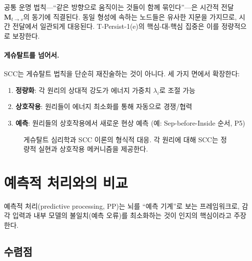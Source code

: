 공통 운명 법칙---``같은 방향으로 움직이는 것들이 함께 묶인다''---은 시간적 전달 $\mathbf{M}_{t \to s}$의 동기에 직결된다. 동일 형성에 속하는 노드들은 유사한 지문을 가지므로, 시간 전달에서 일관되게 대응된다. T-Persist-1(e)의 핵심-대-핵심 집중은 이를 정량적으로 보장한다.

\paragraph{게슈탈트를 넘어서.} SCC는 게슈탈트 법칙을 단순히 재진술하는 것이 아니다. 세 가지 면에서 확장한다:
\begin{enumerate}
    \item \textbf{정량화}: 각 원리의 상대적 강도가 에너지 가중치 $\lambda_i$로 조절 가능
    \item \textbf{상호작용}: 원리들이 에너지 최소화를 통해 자동으로 경쟁/협력
    \item \textbf{예측}: 원리들의 상호작용에서 새로운 현상 예측 (예: Sep-before-Inside 순서, P5)
\end{enumerate}

\begin{figure}[t]
\centering
{}
\caption{게슈탈트 심리학과 SCC 이론의 형식적 대응. 각 원리에 대해 SCC는 정량적 실현과 상호작용 메커니즘을 제공한다.}
\label{fig:gestalt-mapping}
\end{figure}


\section{예측적 처리와의 비교}
\label{sec:predictive-processing}

예측적 처리(predictive processing, PP)는 뇌를 ``예측 기계''로 보는 프레임워크로, 감각 입력과 내부 모델의 불일치(예측 오류)를 최소화하는 것이 인지의 핵심이라고 주장한다.

\subsection{수렴점}

